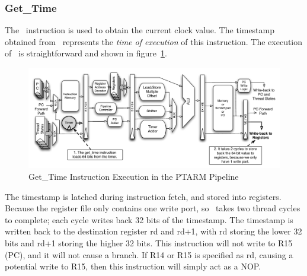 \subsubsection{Get\_Time}    
The \gettime\ instruction is used to obtain the current clock value.
The timestamp obtained from \gettime\ represents the \emph{time of execution} of this instruction.
The execution of \gettime\ is straightforward and shown in figure~\ref{fig:get_time_pipeline_implementation}. 
\begin{figure}[h]
  \vspace{-15pt}
  \begin{center}
    \includegraphics[scale=.54]{figs/get_time_pipeline_implementation}
  \end{center}
  \vspace{-3mm}
  \caption{Get\_Time Instruction Execution in the PTARM Pipeline}
  \label{fig:get_time_pipeline_implementation}
\end{figure}
The timestamp is latched during instruction fetch, and stored into registers.
Because the register file only contains one write port, so \gettime\ takes two thread cycles to complete; each cycle writes back 32 bits of the timestamp. 
The timestamp is written back to the destination register rd and rd+1, with rd storing the lower 32 bits and rd+1 storing the higher 32 bits. 
This instruction will not write to R15 (PC), and it will not cause a branch. 
If R14 or R15 is specified as rd, causing a potential write to R15, then this instruction will simply act as a NOP.

